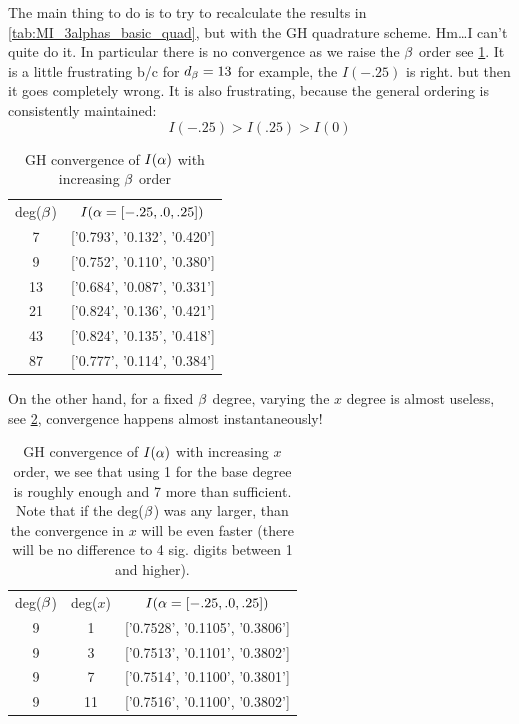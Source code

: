 \documentclass{article}
\begin{document}
The main thing to do is to try to recalculate the results in
\cref{tab:MI_3alphas_basic_quad}, but with the GH quadrature scheme. 
Hm\ldots I can't quite do it. In particular there is no convergence as we raise
the ${\beta}$ order see \cref{tab:GH_convergence_beta}. It is a little frustrating
b/c for $d_{\beta} = 13$ for example, the $I(-.25)$ is right. but then it goes
completely wrong. It is also frustrating, because the general ordering is
consistently maintained:
$$
I(-.25) > I(.25) > I(0)   
$$
\begin{table}
\begin{centering}
\begin{tabular}{cc}
deg(${\beta}$) & $I({\alpha}= [-.25, .0,.25])$ \\
7 & ['0.793', '0.132', '0.420'] \\
9 & ['0.752', '0.110', '0.380'] \\
13 & ['0.684', '0.087', '0.331'] \\
21 & ['0.824', '0.136', '0.421'] \\
43 & ['0.824', '0.135', '0.418'] \\
87 & ['0.777', '0.114', '0.384']
\end{tabular}
\caption{GH convergence of $I({\alpha})$ with increasing ${\beta}$ order}
\label{tab:GH_convergence_beta}
\end{centering}
\end{table}
On the other hand, for a fixed ${\beta}$ degree, varying the $x$ degree is almost
useless, see \cref{tab:GH_convergence_x}, convergence happens almost
instantaneously!

\begin{table}
\begin{centering}
\begin{tabular}{ccc}
deg(${\beta}$) & deg($x$) &$I({\alpha}= [-.25, .0,.25])$ \\
9 & 1 & ['0.7528', '0.1105', '0.3806'] \\
9 & 3 & ['0.7513', '0.1101', '0.3802'] \\
9 & 7 & ['0.7514', '0.1100', '0.3801'] \\
9 & 11 & ['0.7516', '0.1100', '0.3802'] \\
\end{tabular}
\caption{GH convergence of $I({\alpha})$ with increasing $x$ order, we see that using
1 for the base degree is roughly enough and 7 more than sufficient. Note that
if the deg(${\beta}$) was any larger, than the convergence in $x$ will be even
faster (there will be no difference to 4 sig. digits between 1 and higher). }
\label{tab:GH_convergence_x}
\end{centering}
\end{table}
 
\end{document}
